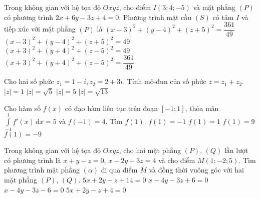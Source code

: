 \begin{ex}%
Trong không gian với hệ tọa độ $Oxyz$, cho điểm $I(3;4;-5)$ và mặt phẳng $(P)$ có phương trình $2x+6y-3z+4=0$. Phương trình mặt cầu $(S)$ có tâm $I$ và tiếp xúc với mặt phẳng $(P)$ là
\choice
{$(x-3)^2+(y-4)^2+(z+5)^2=\dfrac{361}{49}$}
{\True $(x-3)^2+(y-4)^2+(z+5)^2=49$}
{$(x+3)^2+(y+4)^2+(z-5)^2=49$}
{$(x+3)^2+(y+4)^2+(z-5)^2=\dfrac{361}{49}$}

\end{ex}


\begin{ex}%
Cho hai số phức $z_1=1-i,z_2=2+3i$. Tính mô-đun của số phức $z=z_1+z_2$.
\choice
{$|z|=1$}
{$|z|=\sqrt{5}$}
{$|z|=5$}
{\True $|z|=\sqrt{13}$}

\end{ex}


\begin{ex}%
Cho hàm số $f(x)$ có đạo hàm liên tục trên đoạn $[-1;1]$, thỏa mãn $\displaystyle\int\limits_{-1}^{1} f'(x) \mathrm{\,d}x=5$ và $f(-1)=4$. Tìm $f(1)$.
\choice
{$f(1)=-1$}
{$f(1)=1$}
{\True $f(1)=9$}
{$f(1)=-9$}

\end{ex}

\begin{ex}%
Trong không gian với hệ tọa độ $Oxyz$, cho hai mặt phẳng $(P)$, $(Q)$ lần lượt có phương trình là $x+y-z=0$, $x-2y+3z=4$ và cho điểm $M(1;-2;5)$. Tìm phương trình mặt phẳng $(\alpha)$ đi qua điểm $M$ và đồng thời vuông góc với hai mặt phẳng $(P)$, $(Q)$.
\choice
{$5x+2y-z+14=0$}
{\True $x-4y-3z+6=0$}
{$x-4y-3z-6=0$}
{$5x+2y-z+4=0$}
\end{ex}

